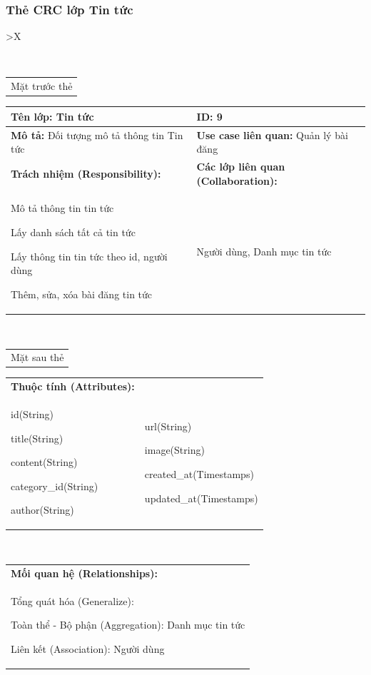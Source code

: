 \newpage
\subsubsection{Thẻ CRC lớp Tin tức}
  \begin{xltabular}{\textwidth}{
    >{\centering\arraybackslash}X 
  }
  \caption{\bfseries \fontsize{12pt}{0pt}\selectfont Thẻ CRC lớp Tài khoản}
  \\
  \begin{tabularx}{0.9\textwidth}{X}
    Mặt trước thẻ
  \end{tabularx}
  \begin{tabularx}{0.9\textwidth}{|X|X|}
    \hline
    \textbf{Tên lớp:} Tin tức & \textbf{ID:} 9 \\
    \hline
    \textbf{Mô tả:} Đối tượng mô tả thông tin Tin tức & \textbf{Use case liên quan:}  Quản lý bài đăng\\
    \hline
    \textbf{Trách nhiệm (Responsibility):} & \textbf{Các lớp liên quan (Collaboration):} \\
    Mô tả thông tin tin tức

    Lấy danh sách tất cả tin tức

    Lấy thông tin tin tức theo id, người dùng

    Thêm, sửa, xóa bài đăng tin tức
    & 
    Người dùng, Danh mục tin tức
    \\
    \hline
  \end{tabularx}
  \\ 
  \begin{tabularx}{0.9\textwidth}{X}
    Mặt sau thẻ
  \end{tabularx}
  \begin{tabularx}{0.9\textwidth}{|X|X|}
    \hline
    \textbf{Thuộc tính (Attributes):} & \\
    id(String) 
    
    title(String)

    content(String)

    category\_id(String)

    author(String) 
    & 
    url(String) 

    image(String) 
          
    created\_at(Timestamps)

    updated\_at(Timestamps)
    \\
    \hline
  \end{tabularx}
  \\     
  \begin{tabularx}{0.9\textwidth}{|X|}
    \textbf{Mối quan hệ (Relationships):} \\
    Tổng quát hóa (Generalize):

    Toàn thể - Bộ phận (Aggregation): Danh mục tin tức
    
    Liên kết (Association): Người dùng
    \\
    \hline
  \end{tabularx}
  \end{xltabular}

